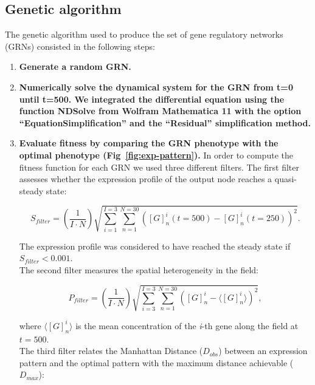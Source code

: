 \documentclass[10pt,letterpaper]{article}
\begin{document}
\subsection*{Genetic algorithm}

The genetic algorithm used to produce the set of gene regulatory networks (GRNs)
consisted in the following steps:

\begin{enumerate}
 \item{\bf Generate a random GRN.}
 
 \item{\bf{Numerically solve the dynamical system for the GRN from t=0 until 
t=500.} We integrated the differential equation using the function NDSolve from 
Wolfram Mathematica 11 with the option “EquationSimplification” and the 
“Residual” simplification method.}
 
 \item{\bf Evaluate fitness by comparing the GRN phenotype with the optimal 
 phenotype (Fig~\ref{fig:exp-pattern}).} In order to compute the fitness 
 function for each GRN we used three different filters. The first filter 
 assesses whether the expression profile of the output node reaches a 
 quasi-steady state:
 
 \begin{equation}
  S_{filter} = \left( \frac{1}{I \cdot N}\right) \sqrt{\sum_{i=1}^{I=3}
  \sum_{n=1}^{N=30} ([G]_n^i(t=500) - [G]^i_n(t=250))^2}.
 \end{equation}
 
 The expression profile was considered to have reached the steady state if 
 $S_{filter} < 0.001$.\\
 
 The second filter measures the spatial heterogeneity in the field:
 
 \begin{equation}
  P_{filter} = \left( \frac{1}{I \cdot N} \right) \sqrt{ \sum_{i=3}^{I=3}
  \sum_{n=1}^{N=30} \left( [G]^i_n - \langle [G]^i_n \rangle \right)^2 },
 \end{equation}
 
 where $\langle [G]^i_n \rangle$ is the mean concentration of the \emph{i}-th 
 gene along the field at $t=500$.\\
 
 The third filter relates the Manhattan Distance ($D_{obs}$) between an
 expression pattern and the optimal pattern with the maximum distance achievable
 ($D_{max}$):
 

\end{enumerate}
\end{document}
